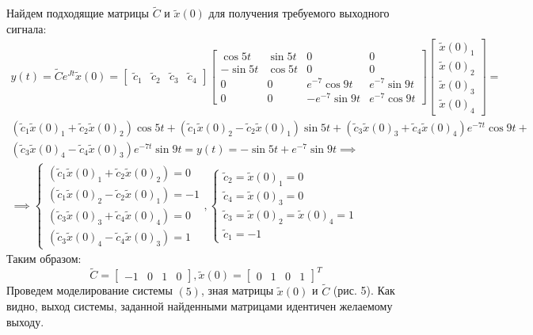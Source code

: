 Найдем подходящие матрицы $\widetilde{C}$ и $\widetilde{x}(0)$ для получения требуемого выходного сигнала:
\begin{gather*}
    y(t) = \widetilde{C}e^{Jt}\widetilde{x}(0) =
    \begin{bmatrix}
        \tilde{c}_1 & \tilde{c}_2 & \tilde{c}_3 & \tilde{c}_4 
    \end{bmatrix} 
    \begin{bmatrix}
        \cos{5t} & \sin{5t} & 0 & 0   \\
        -\sin{5t} & \cos{5t} & 0 & 0  \\
        0 & 0 & e^{-7}\cos{9t} & e^{-7}\sin{9t} \\
        0 & 0 & -e^{-7}\sin{9t} & e^{-7}\cos{9t}
        \end{bmatrix}
    \begin{bmatrix}
        \tilde{x}(0)_1\\
        \tilde{x}(0)_2\\
        \tilde{x}(0)_3\\
        \tilde{x}(0)_4
    \end{bmatrix}
     = \\ (\tilde{c}_1\tilde{x}(0)_1 + \tilde{c}_2\tilde{x}(0)_2) \cos{5t} +
    (\tilde{c}_1\tilde{x}(0)_2 - \tilde{c}_2\tilde{x}(0)_1) \sin{5t} + 
    (\tilde{c}_3\tilde{x}(0)_3 + \tilde{c}_4\tilde{x}(0)_4) e^{-7t}\cos{9t} + \\
    (\tilde{c}_3\tilde{x}(0)_4 - \tilde{c}_4\tilde{x}(0)_3) e^{-7t}\sin{9t} = 
    y(t) = -\sin{5t} + e^{-7}\sin{9t} \implies \\
    \implies
    \begin{cases}
        (\tilde{c}_1\tilde{x}(0)_1 + \tilde{c}_2\tilde{x}(0)_2) = 0 \\
        (\tilde{c}_1\tilde{x}(0)_2 - \tilde{c}_2\tilde{x}(0)_1) = -1 \\
        (\tilde{c}_3\tilde{x}(0)_3 + \tilde{c}_4\tilde{x}(0)_4) = 0 \\
        (\tilde{c}_3\tilde{x}(0)_4 - \tilde{c}_4\tilde{x}(0)_3) = 1
    \end{cases},
    \begin{cases}
        \tilde{c}_2 = \tilde{x}(0)_1 = 0 \\
        \tilde{c}_4 = \tilde{x}(0)_3 = 0 \\
        \tilde{c}_3 = \tilde{x}(0)_2 = \tilde{x}(0)_4 = 1 \\
        \tilde{c}_1 = -1
    \end{cases}
\end{gather*}
Таким образом:
\begin{equation*}
    \widetilde{C} = \begin{bmatrix}
        -1 & 0 & 1 & 0
    \end{bmatrix},
    \widetilde{x}(0) = \begin{bmatrix}
        0 & 1 & 0 & 1
    \end{bmatrix}^T
\end{equation*}
Проведем моделирование системы $(5)$, зная матрицы $\widetilde{x}(0)$ и $\widetilde{C}$ (рис. 5). Как видно, 
выход системы, заданной найденными матрицами идентичен желаемому выходу.

